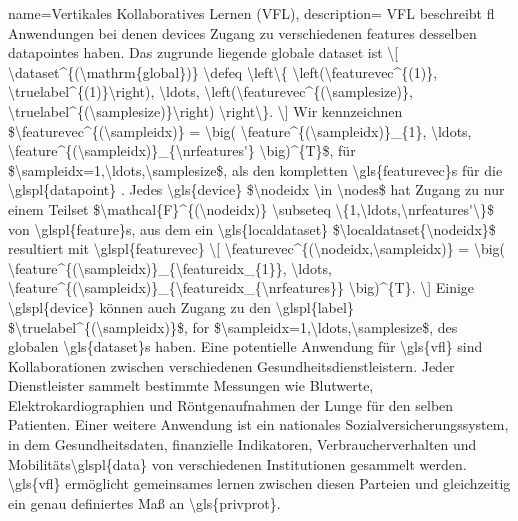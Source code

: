 {{{
{name={Vertikales Kollaboratives Lernen (VFL)},
	description={
		VFL beschreibt  \gls{fl}  Anwendungen bei denen 
		\gls{device}s Zugang zu verschiedenen  \gls{feature}s desselben  \gls{datapoint}es  \cite{VFLChapter} haben. 
		Das zugrunde liegende globale \gls{dataset ist 
		\[
		\dataset^{(\mathrm{global})} \defeq \left\{ \left(\featurevec^{(1)}, \truelabel^{(1)}\right), \ldots, \left(\featurevec^{(\samplesize)}, \truelabel^{(\samplesize)}\right) \right\}.
		\]
		Wir kennzeichnen  $\featurevec^{(\sampleidx)} = \big( \feature^{(\sampleidx)}_{1}, \ldots, \feature^{(\sampleidx)}_{\nrfeatures'} \big)^{T}$, für $\sampleidx=1,\ldots,\samplesize$, 
		als den kompletten  \gls{featurevec}s für die \glspl{datapoint} . Jedes \gls{device} $\nodeidx \in \nodes$ 
		hat Zugang zu nur einem Teilset  $\mathcal{F}^{(\nodeidx)} \subseteq \{1,\ldots,\nrfeatures'\}$ von  \glspl{feature}s, aus dem ein  
		 \gls{localdataset}  $\localdataset{\nodeidx}$ resultiert mit  \glspl{featurevec}
		\[
		\featurevec^{(\nodeidx,\sampleidx)} = \big( \feature^{(\sampleidx)}_{\featureidx_{1}}, \ldots, \feature^{(\sampleidx)}_{\featureidx_{\nrfeatures}} \big)^{T}.
		\]
		Einige  \glspl{device} können auch Zugang zu den \glspl{label} $\truelabel^{(\sampleidx)}$, for $\sampleidx=1,\ldots,\samplesize$, des globalen \gls{dataset}s haben. Eine potentielle Anwendung für \gls{vfl} sind Kollaborationen zwischen verschiedenen Gesundheitsdienstleistern. 
		Jeder Dienstleister sammelt bestimmte Messungen wie Blutwerte, Elektrokardiographien und Röntgenaufnahmen der Lunge für den selben Patienten. 
		Einer weitere Anwendung ist ein nationales Sozialversicherungssystem, in dem Gesundheitsdaten, finanzielle Indikatoren, Verbraucherverhalten und Mobilitäts\glspl{data} von verschiedenen Institutionen gesammelt werden.  \gls{vfl} ermöglicht gemeinsames lernen zwischen diesen Parteien und gleichzeitig ein genau definiertes Maß an \gls{privprot}.
		
}}}}}}

